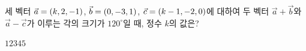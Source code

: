 세 벡터 $\vec{a}=(k{,}\mkern3mu\mathopen{}2{,}\mkern3mu\mathopen{}-1)$, $\vec{b}=(0{,}\mkern3mu\mathopen{}-3{,}\mkern3mu\mathopen{}1)$, $\vec{c}=(k-1{,}\mkern3mu\mathopen{}-2{,}\mkern3mu\mathopen{}0)$에 대하여 두 벡터 $\vec{a}+\vec{b}$와 $\vec{a}-\vec{c}$가 이루는 각의 크기가 $120^\circ$일 때, 정수 $k$의 값은?
\begin{choices32}{$1$}{$2$}{$3$}{$4$}{$5$}\end{choices32}
